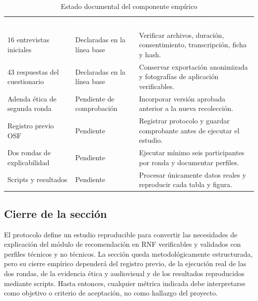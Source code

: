 \documentclass[12pt,a4paper]{article}
\begin{document}
\begin{table}[H]
\centering
\caption{Estado documental del componente empírico}
\label{tab:estado-componente-empirico}
\small
{}
\begin{tabularx}{\textwidth}{L{4.2cm} L{3.0cm} Y}
\textcolor{white}{\textbf{Elemento}} &
\textcolor{white}{\textbf{Estado actual}} &
\textcolor{white}{\textbf{Acción para cierre}}\\
16 entrevistas iniciales & Declaradas en la línea base & Verificar archivos, duración, consentimiento, transcripción, ficha y hash.\\
43 respuestas del cuestionario & Declaradas en la línea base & Conservar exportación anonimizada y fotografías de aplicación verificables.\\
Adenda ética de segunda ronda & Pendiente de comprobación & Incorporar versión aprobada anterior a la nueva recolección.\\
Registro previo OSF & Pendiente & Registrar protocolo y guardar comprobante antes de ejecutar el estudio.\\
Dos rondas de explicabilidad & Pendiente & Ejecutar mínimo seis participantes por ronda y documentar perfiles.\\
Scripts y resultados & Pendiente & Procesar únicamente datos reales y reproducir cada tabla y figura.\\
\end{tabularx}
\end{table}

\subsection{Cierre de la sección}

El protocolo define un estudio reproducible para convertir las necesidades de explicación del módulo de recomendación en RNF verificables y validados con perfiles técnicos y no técnicos. La sección queda metodológicamente estructurada, pero su cierre empírico dependerá del registro previo, de la ejecución real de las dos rondas, de la evidencia ética y audiovisual y de los resultados reproducidos mediante scripts. Hasta entonces, cualquier métrica indicada debe interpretarse como objetivo o criterio de aceptación, no como hallazgo del proyecto.



\end{document}
